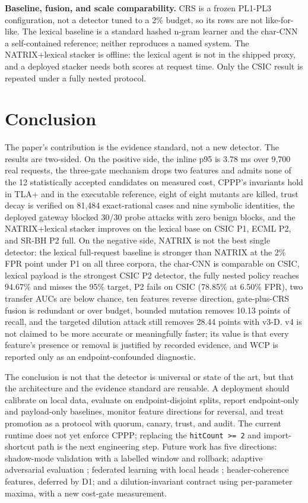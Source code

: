 \documentclass[preprint,11pt]{elsarticle}
\begin{document}
\textbf{Baseline, fusion, and scale comparability.} CRS is a frozen
PL1-PL3 configuration, not a detector tuned to a 2\% budget, so its rows
are not like-for-like. The lexical baseline is a standard hashed n-gram
learner and the char-CNN a self-contained reference; neither reproduces
a named system. The NATRIX+lexical stacker is offline: the lexical agent
is not in the shipped proxy, and a deployed stacker needs both scores at
request time. Only the CSIC result is repeated under a fully nested
protocol.

\section{Conclusion}\label{conclusion}

The paper's contribution is the evidence standard, not a new detector.
The results are two-sided. On the positive side, the inline p95 is 3.78
ms over 9,700 real requests, the three-gate mechanism drops two features
and admits none of the 12 statistically accepted candidates on measured
cost, CPPP's invariants hold in TLA+ and in the executable reference,
eight of eight mutants are killed, trust decay is verified on 81,484
exact-rational cases and nine symbolic identities, the deployed gateway
blocked 30/30 probe attacks with zero benign blocks, and the
NATRIX+lexical stacker improves on the lexical base on CSIC P1, ECML P2,
and SR-BH P2 full. On the negative side, NATRIX is not the best single
detector: the lexical full-request baseline is stronger than NATRIX at
the 2\% FPR point under P1 on all three corpora, the char-CNN is
comparable on CSIC, lexical payload is the strongest CSIC P2 detector,
the fully nested policy reaches 94.67\% and misses the 95\% target, P2
fails on CSIC (78.85\% at 6.50\% FPR), two transfer AUCs are below
chance, ten features reverse direction, gate-plus-CRS fusion is
redundant or over budget, bounded mutation removes 10.13 points of
recall, and the targeted dilution attack still removes 28.44 points with
v3-D. v4 is not claimed to be more accurate or meaningfully faster; its
value is that every feature's presence or removal is justified by
recorded evidence, and WCP is reported only as an endpoint-confounded
diagnostic.

The conclusion is not that the detector is universal or state of the
art, but that the architecture and the evidence standard are reusable. A
deployment should calibrate on local data, evaluate on endpoint-disjoint
splits, report endpoint-only and payload-only baselines, monitor feature
directions for reversal, and treat promotion as a protocol with quorum,
canary, trust, and audit. The current runtime does not yet enforce CPPP;
replacing the \texttt{hitCount\ \textgreater{}=\ 2} and import-shortcut
path is the next engineering step. Future work has five directions:
shadow-mode validation with a labelled window and rollback; adaptive
adversarial evaluation \citep{biggio2018wild}; federated learning with
local heads \citep{mcmahan2017communication, kairouz2021advances};
header-coherence features, deferred by D1; and a dilution-invariant
contract using per-parameter maxima, with a new cost-gate measurement.
\end{document}
